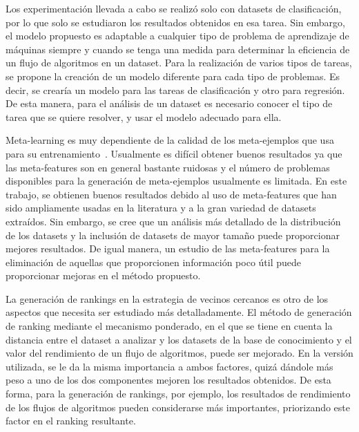 Los experimentación llevada a cabo se realizó solo con datasets de clasificación, por lo que solo se estudiaron los resultados obtenidos en esa tarea. Sin embargo, el modelo propuesto es adaptable a cualquier tipo de problema de aprendizaje de máquinas siempre y cuando se tenga una medida para determinar la eficiencia de un flujo de algoritmos en un dataset. Para la realización de varios tipos de tareas, se propone la creación de un modelo diferente para cada tipo de problemas. Es decir, se crearía un modelo para las tareas de clasificación y otro para regresión. De esta manera, para el análisis de un dataset es necesario conocer el tipo de tarea que se quiere resolver, y usar el modelo adecuado para ella.

Meta-learning es muy dependiente de la calidad de los meta-ejemplos que usa para su entrenamiento~\cite{gomes2012combining}. Usualmente es difícil obtener buenos resultados ya que las meta-features son en general bastante ruidosas y el número de problemas disponibles para la generación de meta-ejemplos usualmente es limitada. En este trabajo, se obtienen buenos resultados debido al uso de meta-features que han sido ampliamente usadas en la literatura y a la gran variedad de datasets extraídos. Sin embargo, se cree que un análisis más detallado de la distribución de los datasets y la inclusión de datasets de mayor tamaño puede proporcionar mejores resultados. De igual manera, un estudio de las meta-features para la eliminación de aquellas que proporcionen información poco útil puede proporcionar mejoras en el método propuesto.

La generación de rankings en la estrategia de vecinos cercanos es otro de los aspectos que necesita ser estudiado más detalladamente. El método de generación de ranking mediante el mecanismo ponderado, en el que se tiene en cuenta la distancia entre el dataset a analizar y los datasets de la base de conocimiento y el valor del rendimiento de un flujo de algoritmos, puede ser mejorado. En la versión utilizada, se le da la misma importancia a ambos factores, quizá dándole más peso a uno de los dos componentes mejoren los resultados obtenidos. De esta forma, para la generación de rankings, por ejemplo, los resultados de rendimiento de los flujos de algoritmos pueden considerarse más importantes, priorizando este factor en el ranking resultante.






